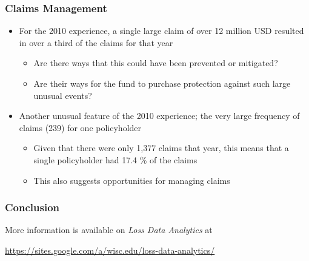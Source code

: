 \documentclass[serif,10pt]{beamer}
\begin{document}
\begin{frame}
\frametitle{Claims Management}
  \begin{itemize}
\item For the 2010 experience, a single large claim of over 12 million USD resulted in over a third of the claims for that
year \vspace{2mm}
  \begin{itemize}
\item  Are there ways that this could have been prevented or
mitigated? \vspace{2mm}
\item  Are their ways for the fund to purchase protection against such large unusual
events? \vspace{2mm}
\end{itemize}
\item Another unusual feature of the 2010 experience; the very large frequency of claims (239) for one
policyholder \vspace{2mm}
  \begin{itemize}
\item  Given that there were only 1,377 claims that year, this means that a single policyholder had 17.4 \% of the
claims \vspace{2mm}
\item  This also suggests opportunities for managing claims
\end{itemize}
\end{itemize}
\end{frame}


\begin{frame}%
\frametitle{Conclusion}
More information is available on \textit{Loss Data Analytics} at

\bigskip

{\small \url{https://sites.google.com/a/wisc.edu/loss-data-analytics/}}

\bigskip

\end{frame}
\end{document}

